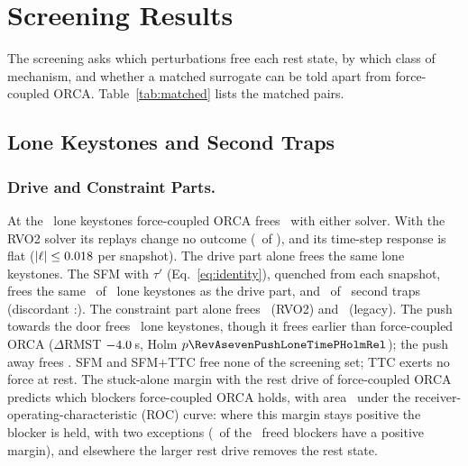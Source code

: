 \section{Screening Results}\label{sec:attribution}
The screening asks which perturbations free each rest state, by which class of mechanism, and whether a matched surrogate can be told apart from force-coupled ORCA. Table~\ref{tab:matched} lists the matched pairs.


\subsection{Lone Keystones and Second Traps}\label{sec:att-lone}
\subsubsection{Drive and Constraint Parts.}
At the \EtwoNLK\ lone keystones force-coupled ORCA frees \EtwoLKCThreeRVOFreed\ with either solver. With the RVO2 solver its replays change no outcome (\TabThreeLKRvoReplayDis\ of \TabThreeLKRvoReplays), and its time-step response is flat ($|\ell|\le0.018$ per snapshot). The drive part alone frees the same lone keystones. The SFM with $\tau'$ (Eq.~\eqref{eq:identity}), quenched from each snapshot, frees the same \RevAoneLoneFreed\ of \RevAoneLoneN\ lone keystones as the drive part, and \RevAoneSecondFreed\ of \RevAoneSecondN\ second traps (discordant \RevAoneDiscA:\RevAoneDiscB). The constraint part alone frees \EtwoLKConstrRVOFreed\ (RVO2) and \EtwoLKConstrPubFreed\ (legacy). The push towards the door frees \EtwoLKFrozenPlusFreed\ lone keystones, though it frees earlier than force-coupled ORCA ($\Delta$RMST $-4.0$\,s, Holm $p\RevAsevenPushLoneTimePHolmRel$); the push away frees \EtwoLKFrozenMinusFreed. SFM and SFM+TTC free none of the screening set; TTC exerts no force at rest. The stuck-alone margin with the rest drive of force-coupled ORCA predicts which blockers force-coupled ORCA holds, with area \EtwoLKMarginAUC\ under the receiver-operating-characteristic (ROC) curve: where this margin stays positive the blocker is held, with two exceptions (\PthreeRocFreedPos\ of the \RwSixRocFreed\ freed blockers have a positive margin), and elsewhere the larger rest drive removes the rest state.

